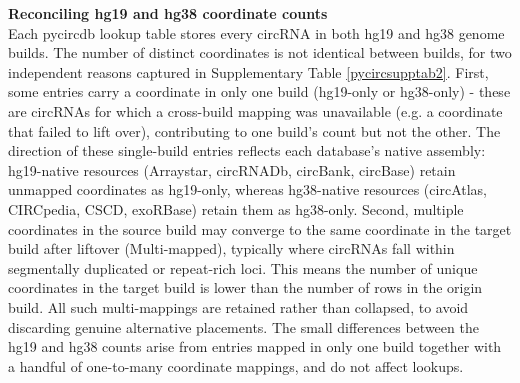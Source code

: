 \clearpage



\begin{table}[h!]
  \centering
  \caption[Lookup table breakdown between hg19 and hg38 coordinates]{Lookup table breakdown between hg19 and hg38 coordinates. }
  \label{pycircsupptab2}
  \footnotesize
\end{table}


\noindent \textbf{Reconciling hg19 and hg38 coordinate counts}\\
Each pycircdb lookup table stores every circRNA in both hg19 and hg38 genome builds. The number of distinct coordinates is not identical between builds, for two independent reasons captured in Supplementary Table \ref{pycircsupptab2}. First, some entries carry a coordinate in only one build (hg19-only or hg38-only) - these are circRNAs for which a cross-build mapping was unavailable (e.g. a coordinate that failed to lift over), contributing to one build's count but not the other. The direction of these single-build entries reflects each database's native assembly: hg19-native resources (Arraystar, circRNADb, circBank, circBase) retain unmapped coordinates as hg19-only, whereas hg38-native resources (circAtlas, CIRCpedia, CSCD, exoRBase) retain them as hg38-only. Second, multiple coordinates in the source build may converge to the same coordinate in the target build after liftover (Multi-mapped), typically where circRNAs fall within segmentally duplicated or repeat-rich loci. This means the number of unique coordinates in the target build is lower than the number of rows in the origin build. All such multi-mappings are retained rather than collapsed, to avoid discarding genuine alternative placements. The small differences between the hg19 and hg38 counts arise from entries mapped in only one build together with a handful of one-to-many coordinate mappings, and do not affect lookups.

